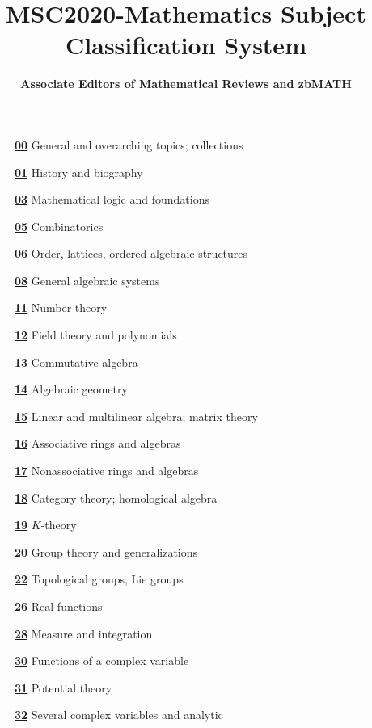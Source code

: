 \documentclass[letterpaper]{article}
\title{\textbf{MSC2020-Mathematics Subject Classification System}}
\author{\textbf{Associate Editors of Mathematical Reviews and zbMATH}}
\date{}
\begin{document}
\maketitle
\small
\begin{multicols}{2}
\begin{description}
\item []\hyperref[00-XX]{\textbf{00}}  General and overarching topics; collections 
\item []\hyperref[01-XX]{\textbf{01}}  History and biography  
\item []\hyperref[03-XX]{\textbf{03}}  Mathematical logic and foundations 
\item []\hyperref[05-XX]{\textbf{05}}  Combinatorics  
\item []\hyperref[06-XX]{\textbf{06}}  Order, lattices, ordered algebraic 
structures 
\item []\hyperref[08-XX]{\textbf{08}}  General algebraic systems 
\item []\hyperref[11-XX]{\textbf{11}}  Number theory 
\item []\hyperref[12-XX]{\textbf{12}}  Field theory and polynomials 
\item []\hyperref[13-XX]{\textbf{13}}  Commutative algebra 
\item []\hyperref[14-XX]{\textbf{14}}  Algebraic geometry 
\item []\hyperref[15-XX]{\textbf{15}}  Linear and multilinear algebra; matrix 
theory 
\item []\hyperref[16-XX]{\textbf{16}}  Associative rings and algebras  
\item []\hyperref[17-XX]{\textbf{17}}  Nonassociative rings and algebras 
\item []\hyperref[18-XX]{\textbf{18}}  Category theory; homological algebra 
\item []\hyperref[19-XX]{\textbf{19}}  $K$-theory  
\item []\hyperref[20-XX]{\textbf{20}}  Group theory and generalizations 
\item []\hyperref[22-XX]{\textbf{22}}  Topological groups, Lie groups  
\item []\hyperref[26-XX]{\textbf{26}}  Real functions 
\item []\hyperref[28-XX]{\textbf{28}}  Measure and integration  
\item []\hyperref[30-XX]{\textbf{30}}  Functions of a complex variable  
\item []\hyperref[31-XX]{\textbf{31}}  Potential theory  
\item []\hyperref[32-XX]{\textbf{32}}  Several complex variables and analytic 

\end{description}
\end{multicols}
\end{document}
